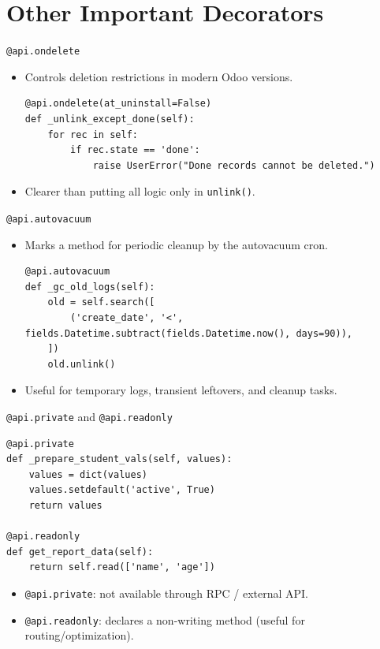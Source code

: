 \section{Other Important Decorators}

\begin{frame}[fragile]{\texttt{@api.ondelete}}
	\begin{itemize}
		\item Controls deletion restrictions in modern Odoo versions.
\begin{lstlisting}
@api.ondelete(at_uninstall=False)
def _unlink_except_done(self):
	for rec in self:
		if rec.state == 'done':
			raise UserError("Done records cannot be deleted.")
\end{lstlisting}
		\item Clearer than putting all logic only in \texttt{unlink()}.
	\end{itemize}
\end{frame}

\begin{frame}[fragile]{\texttt{@api.autovacuum}}
	\begin{itemize}
		\item Marks a method for periodic cleanup by the autovacuum cron.
\begin{lstlisting}
@api.autovacuum
def _gc_old_logs(self):
	old = self.search([
		('create_date', '<', fields.Datetime.subtract(fields.Datetime.now(), days=90)),
	])
	old.unlink()
\end{lstlisting}
		\item Useful for temporary logs, transient leftovers, and cleanup tasks.
	\end{itemize}
\end{frame}

\begin{frame}[fragile]{\texttt{@api.private} and \texttt{@api.readonly}}
\begin{lstlisting}
@api.private
def _prepare_student_vals(self, values):
	values = dict(values)
	values.setdefault('active', True)
	return values

@api.readonly
def get_report_data(self):
	return self.read(['name', 'age'])
\end{lstlisting}
	\begin{itemize}
		\item \texttt{@api.private}: not available through RPC / external API.
		\item \texttt{@api.readonly}: declares a non-writing method (useful for routing/optimization).
	\end{itemize}
\end{frame}

